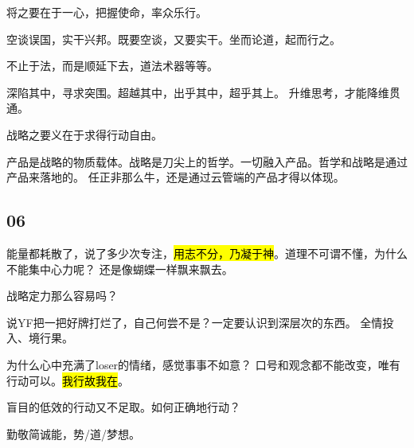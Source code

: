 将之要在于一心，把握使命，率众乐行。

空谈误国，实干兴邦。既要空谈，又要实干。坐而论道，起而行之。

不止于法，而是顺延下去，道法术器等等。

深陷其中，寻求突围。超越其中，出乎其中，超乎其上。
升维思考，才能降维贯通。

战略之要义在于求得行动自由。

\hrulefill

产品是战略的物质载体。战略是刀尖上的哲学。一切融入产品。哲学和战略是通过产品来落地的。
任正非那么牛，还是通过云管端的产品才得以体现。

\subsection{06}

能量都耗散了，说了多少次专注，\hl{用志不分，乃凝于神}。道理不可谓不懂，为什么不能集中心力呢？
还是像蝴蝶一样飘来飘去。

战略定力那么容易吗？

说YF把一把好牌打烂了，自己何尝不是？一定要认识到深层次的东西。
全情投入、境行果。

\hrulefill

为什么心中充满了loser的情绪，感觉事事不如意？
口号和观念都不能改变，唯有行动可以。\hl{我行故我在}。

盲目的低效的行动又不足取。如何正确地行动？

勤敬简诚能，势/道/梦想。
